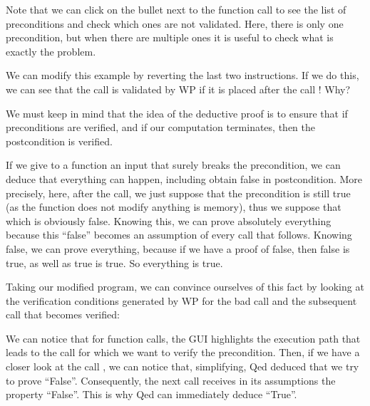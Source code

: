 



Note that we can click on the bullet next to the function call to see the
list of preconditions and check which ones are not validated. Here, there is
only one precondition, but when there are multiple ones it is useful to check
what is exactly the problem.



We can modify this example by reverting the last two instructions. If we
do this, we can see that the call  is validated by WP if
it is placed after the call ! Why?



We must keep in mind that the idea of the deductive proof is to ensure
that if preconditions are verified, and if our computation terminates,
then the postcondition is verified.



If we give to a function an input that surely breaks the precondition, we can
deduce that everything can happen, including obtain false in postcondition.
More precisely, here, after the call, we just suppose that the precondition
is still true (as the function does not modify anything is memory), thus we
suppose that  which is obviously false.
Knowing this, we can prove absolutely everything because this ``false'' becomes
an assumption of every call that follows. Knowing false, we can prove everything,
because if we have a proof of false, then false is true, as well as true is true.
So everything is true.



Taking our modified program, we can convince ourselves of this fact by
looking at the verification conditions generated by WP for the bad call and the
subsequent call that becomes verified:







We can notice that for function calls, the GUI highlights the execution
path that leads to the call for which we want to verify the precondition.
Then, if we have a closer look at the call , we
can notice that, simplifying, Qed deduced that we try to prove
``False''. Consequently, the next call  receives in its
assumptions the property ``False''. This is why Qed can immediately
deduce ``True''.



